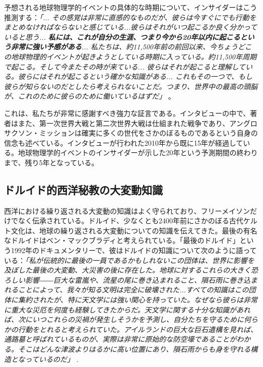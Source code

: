 \documentclass[10pt,twocolumn,letterpaper]{article}
\begin{document}
予想される地球物理学的イベントの具体的な時期について、インサイダーはこう推測する：\textit{「... その感覚は非常に直感的なものだが、彼らは今すぐにでも行動をまとめなければならないと感じている...彼らはそれがいつ起こるか良く分かっていると思う... \textbf{私には、これが自分の生涯、つまり今から20年以内に起こるという非常に強い予感がある}... 私たちは、約11,500年前の前回以来、今ちょうどこの地球物理的イベントが起きようとしている時期に入っている。約11,500年周期で起こる。そして今またその時が来ている... 彼らはそれが起こると理解している。彼らにはそれが起こるという確かな知識がある... これもその一つで、もし彼らが知らないのだとしたら考えられないことだ。つまり、世界中の最高の頭脳が、これのために彼らのために働いているはずだ」} \cite{4}。

これは、私たちが非常に感謝すべき強力な証言である。インタビューの中で、著者はまた、第一次世界大戦と第二次世界大戦は仕組まれた戦争であり、アングロサクソン・ミッションは確実に多くの世代をさかのぼるものであるという自身の信念も述べている。インタビューが行われた2010年から既に15年が経過している。地球物理学的イベントのインサイダーが示した20年という予測期間の終わりまで、残り5年となっている。

\subsection{ドルイド的西洋秘教の大変動知識}

西洋における繰り返される大変動の知識はよく守られており、フリーメイソンだけでなく伝承されている。ドルイド、少なくとも2400年前にさかのぼる古代ケルト文化は\cite{7}、地球の繰り返される大変動についての知識を伝えてきた。最後の有名なドルイドはベン・マックブラディと考えられている。「最後のドルイド」という1992年のドキュメンタリーで、彼はドルイドの知識について次のように語っている：\textit{「私が伝統的に最後の一員であるかもしれないこの団体は、世界に影響を及ぼした最後の大変動、大災害の後に存在した。地球に対するこれらの大きく恐ろしい影響――巨大な雷嵐や、流星の尾に巻き込まれること、隕石雨に巻き込まれることによって、我々が知る文明は完全に破壊された...すべての知識はこの団体に集約されたが、特に天文学には強い関心を持っていた。なぜなら彼らは非常に重大な災厄を何度も経験してきたからだ。天文学に関する十分な知識があれば、次にいつこれらの災禍が発生しそうかを予測し、自分たちを守るために何らかの行動をとれると考えられていた。アイルランドの巨大な巨石遺構を見れば、通路墓と呼ばれているものが、実際は非常に原始的な防空壕であることがわかる。そこはどんな津波よりはるかに高い位置にあり、隕石雨からも身を守れる構造となっているのだ」} \cite{8,9}.
\end{document}
